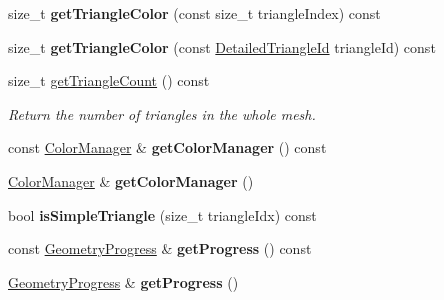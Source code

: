 \begin{DoxyCompactItemize}
\item 
\mbox{\label{classpepr3d_1_1_geometry_a58031509df8f5a9a83e98106cc37af4a}} 
size\+\_\+t {\bfseries get\+Triangle\+Color} (const size\+\_\+t triangle\+Index) const
\item 
\mbox{\label{classpepr3d_1_1_geometry_a83359891c1ed0cf815a5367c56c78d3e}} 
size\+\_\+t {\bfseries get\+Triangle\+Color} (const \mbox{\hyperlink{structpepr3d_1_1_detailed_triangle_id}{Detailed\+Triangle\+Id}} triangle\+Id) const
\item 
\mbox{\label{classpepr3d_1_1_geometry_acca576cfa8a735ecfe36e4fca67204d8}} 
size\+\_\+t \mbox{\hyperlink{classpepr3d_1_1_geometry_acca576cfa8a735ecfe36e4fca67204d8}{get\+Triangle\+Count}} () const
\begin{DoxyCompactList}\small\item\em Return the number of triangles in the whole mesh. \end{DoxyCompactList}\item 
\mbox{\label{classpepr3d_1_1_geometry_a08d96522ac82d058abd68bbda3ac1201}} 
const \mbox{\hyperlink{classpepr3d_1_1_color_manager}{Color\+Manager}} \& {\bfseries get\+Color\+Manager} () const
\item 
\mbox{\label{classpepr3d_1_1_geometry_a416e1fbfffdbeab4f5775fd0987d312d}} 
\mbox{\hyperlink{classpepr3d_1_1_color_manager}{Color\+Manager}} \& {\bfseries get\+Color\+Manager} ()
\item 
\mbox{\label{classpepr3d_1_1_geometry_a7b3af18af2bd43104f8024ca24c8541d}} 
bool {\bfseries is\+Simple\+Triangle} (size\+\_\+t triangle\+Idx) const
\item 
\mbox{\label{classpepr3d_1_1_geometry_ae0e251c83044d0cd06c50ded6cee21cb}} 
const \mbox{\hyperlink{structpepr3d_1_1_geometry_progress}{Geometry\+Progress}} \& {\bfseries get\+Progress} () const
\item 
\mbox{\label{classpepr3d_1_1_geometry_a3b33233684966de8e2f4ba4fa3d6f02d}} 
\mbox{\hyperlink{structpepr3d_1_1_geometry_progress}{Geometry\+Progress}} \& {\bfseries get\+Progress} ()

\end{DoxyCompactItemize}
